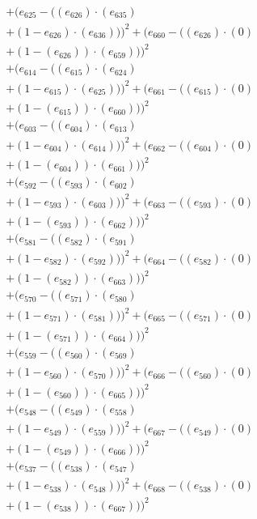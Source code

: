 \documentclass[10pt, a4paper]{article}
\begin{document}
\begin{align*}
& + (e_{625} - ((e_{626})  \cdot  (e_{635}) \\
& + (1 - e_{626})  \cdot  (e_{636})))^{2} + (e_{660} - ((e_{626}) \cdot (0) \\
& + (1 - (e_{626})) \cdot (e_{659})))^{2} \\
& + (e_{614} - ((e_{615})  \cdot  (e_{624}) \\
& + (1 - e_{615})  \cdot  (e_{625})))^{2} + (e_{661} - ((e_{615}) \cdot (0) \\
& + (1 - (e_{615})) \cdot (e_{660})))^{2} \\
& + (e_{603} - ((e_{604})  \cdot  (e_{613}) \\
& + (1 - e_{604})  \cdot  (e_{614})))^{2} + (e_{662} - ((e_{604}) \cdot (0) \\
& + (1 - (e_{604})) \cdot (e_{661})))^{2} \\
& + (e_{592} - ((e_{593})  \cdot  (e_{602}) \\
& + (1 - e_{593})  \cdot  (e_{603})))^{2} + (e_{663} - ((e_{593}) \cdot (0) \\
& + (1 - (e_{593})) \cdot (e_{662})))^{2} \\
& + (e_{581} - ((e_{582})  \cdot  (e_{591}) \\
& + (1 - e_{582})  \cdot  (e_{592})))^{2} + (e_{664} - ((e_{582}) \cdot (0) \\
& + (1 - (e_{582})) \cdot (e_{663})))^{2} \\
& + (e_{570} - ((e_{571})  \cdot  (e_{580}) \\
& + (1 - e_{571})  \cdot  (e_{581})))^{2} + (e_{665} - ((e_{571}) \cdot (0) \\
& + (1 - (e_{571})) \cdot (e_{664})))^{2} \\
& + (e_{559} - ((e_{560})  \cdot  (e_{569}) \\
& + (1 - e_{560})  \cdot  (e_{570})))^{2} + (e_{666} - ((e_{560}) \cdot (0) \\
& + (1 - (e_{560})) \cdot (e_{665})))^{2} \\
& + (e_{548} - ((e_{549})  \cdot  (e_{558}) \\
& + (1 - e_{549})  \cdot  (e_{559})))^{2} + (e_{667} - ((e_{549}) \cdot (0) \\
& + (1 - (e_{549})) \cdot (e_{666})))^{2} \\
& + (e_{537} - ((e_{538})  \cdot  (e_{547}) \\
& + (1 - e_{538})  \cdot  (e_{548})))^{2} + (e_{668} - ((e_{538}) \cdot (0) \\
& + (1 - (e_{538})) \cdot (e_{667})))^{2} \\

\end{align*}
\end{document}
